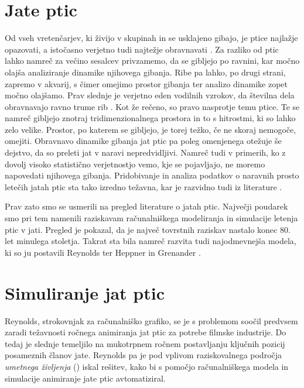 \begin{razsirjeniPovzetek}
\section{Jate ptic}
Od vseh vretenčarjev, ki živijo v skupinah in se usklajeno gibajo, je ptice najlažje opazovati, a istočasno verjetno tudi najtežje obravnavati \cite{heppner:1997}. Za razliko od ptic lahko namreč za večino sesalcev privzamemo, da se gibljejo po ravnini, kar močno olajša analiziranje dinamike njihovega gibanja. Ribe pa lahko, po drugi strani, zapremo v akvarij, s čimer omejimo prostor gibanja ter analizo dinamike zopet močno olajšamo. Prav slednje je verjetno eden vodilnih vzrokov, da številna dela obravnavajo ravno trume rib \cite{aoki:1982,dill:1997,mcfarland:1997,partridge:1982,shaw:1962,terzopoulos:1994,tu:1994,tu:1999,ward:2001,zaera:1996}. Kot že rečeno, so pravo nasprotje temu ptice. Te se namreč gibljejo znotraj tridimenzionalnega prostora in to s hitrostmi, ki so lahko zelo velike. Prostor, po katerem se gibljejo, je torej težko, če ne skoraj nemogoče, omejiti. Obravnavo dinamike gibanja jat ptic pa poleg omenjenega otežuje še dejstvo, da so preleti jat v naravi nepredvidljivi. Namreč tudi v primerih, ko z dovolj visoko statistično verjetnostjo vemo, kje se pojavljajo, ne moremo napovedati njihovega gibanja. Pridobivanje in analiza podatkov o naravnih prosto letečih jatah ptic sta tako izredno težavna, kar je razvidno tudi iz literature \cite{gould:1974,heppner:1997,jaffe:1997,moyle:1998}.

Prav zato smo se usmerili na pregled literature o jatah ptic. Največji poudarek smo pri tem namenili raziskavam računalniškega modeliranja in simulacije letenja ptic v jati. Pregled je pokazal, da je največ tovrstnih raziskav nastalo konec 80. let minulega stoletja. Takrat sta bila namreč razvita tudi najodmevnejša modela, ki so ju postavili Reynolds \cite{reynolds:1987} ter Heppner in Grenander \cite{heppner:1990}. 

\section{Simuliranje jat ptic}
Reynolds, strokovnjak za računalniško grafiko, se je s problemom soočil predvsem zaradi težavnosti ročnega animiranja jat ptic za potrebe filmske industrije. Do tedaj je slednje temeljilo na mukotrpnem ročnem postavljanju ključnih pozicij posameznih članov jate. Reynolds pa je pod vplivom raziskovalnega področja \emph{umetnega življenja} () iskal rešitev, kako bi s pomočjo računalniškega modela in simulacije animiranje jate ptic avtomatiziral. 


\end{razsirjeniPovzetek}
